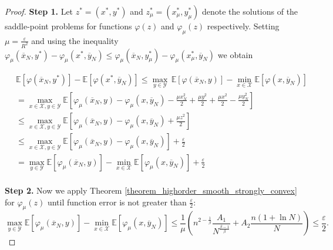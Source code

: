 \documentclass[runningheads]{llncs}
\newcommand{\E}{{\mathbb E}}
\def\E{\mathbb E}
\begin{document}
\begin{proof}
{\bf Step 1.} 
Let $z^*=(x^*, y^*)$ and $z_{\mu}^* = (x_\mu^*, y_\mu^*)$ denote the solutions of the saddle-point problems for functions $\varphi(z)$ and $\varphi_{\mu}(z)$ respectively. 
Setting $\mu = \frac{\varepsilon}{R^2}$ and using the inequality $\varphi_\mu\left(\overline{x}_N , y^*\right) - \varphi_\mu\left(x^*, \overline{y}_N\right) \leq \varphi_\mu\left(\overline{x}_N , y_\mu^*\right) - \varphi_\mu\left(x_\mu^*, \overline{y}_N\right)$ we obtain

\begin{equation}\label{connection}
    \begin{split}
         \,& \E \left[\varphi(\overline{x}_N, y^*)  \right] -
    \E \left[\varphi(x^*, \overline{y}_N) \right] \leq \max_{y\in \mathcal{Y}} \, \E \left[\varphi(\overline{x}_N, y)  \right] -
    \min_{x\in \mathcal{X}}\E \left[\varphi(x, \overline{y}_N) \right]  \\
     &=
    \max_{x\in \mathcal{X}, y\in \mathcal{Y}} \E
    \left[ \varphi_\mu\left(\overline{x}_N , y\right) - \varphi_\mu\left(x, \overline{y}_N\right) - \frac{\mu x_N^2}{2} + \frac{\mu y^2}{2} + \frac{\mu x^2}{2} - \frac{\mu y_N^2}{2} \right]  \\
     & \leq \max_{x\in \mathcal{X}, y\in \mathcal{Y}} \mathbb{E}  \left[ \varphi_\mu\left(\overline{x}_N , y\right) - \varphi_\mu\left(x, \overline{y}_N\right)  + \frac{\mu z^2}{2} \right]\\
     &\leq \max_{x\in \mathcal{X}, y\in \mathcal{Y}} \mathbb{E}  \left[ \varphi_\mu\left(\overline{x}_N , y\right) - \varphi_\mu\left(x, \overline{y}_N\right) \right] + \frac{\varepsilon}{2}\\
     &= \max_{y\in \mathcal{Y}} \E \left[\varphi_\mu(\overline{x}_N, y)  \right] -
    \min_{x\in \mathcal{X}}\E \left[\varphi_\mu(x, \overline{y}_N) \right] + \frac{\varepsilon}{2}\\
    \end{split}
\end{equation}

{\bf Step 2.} 
Now we apply Theorem \ref{theorem_highorder_smooth_strongly_convex} for $\varphi_{\mu}(z)$ until function error is not greater than $\frac{\varepsilon}{2}$:
\begin{equation}\label{ref-theorem-1}
    \max_{y\in \mathcal{Y}} \E \left[\varphi_\mu(\overline{x}_N, y)  \right] -
    \min_{x\in \mathcal{X}}\E \left[\varphi_\mu(x, \overline{y}_N) \right] \leq \dfrac{1}{\mu} \left(n^{2-\frac{1}{\beta}}\dfrac{A_1}{N^{\frac{\beta-1}{\beta}}}+A_2\dfrac{n(1+\ln{N})}{N} \right) \leq \dfrac{\varepsilon}{2}.
\end{equation}


\end{proof}
\end{document}
